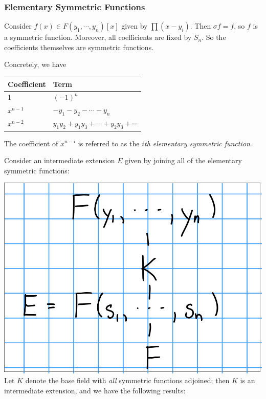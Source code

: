 \hypertarget{elementary-symmetric-functions}{%
\subsubsection{Elementary Symmetric
Functions}\label{elementary-symmetric-functions}}

Consider \(f(x) \in F(y_1, \cdots, y_n)[x]\) given by \(\prod (x-y_i)\).
Then \(\sigma f = f\), so \(f\) is a symmetric function. Moreover, all
coefficients are fixed by \(S_n\). So the coefficients themselves are
symmetric functions.

Concretely, we have

\begin{longtable}[]{@{}ll@{}}
\toprule
Coefficient & Term\tabularnewline
\midrule
\endhead
1 & \((-1)^n\)\tabularnewline
\(x^{n-1}\) & \(-y_1 - y_2 - \cdots - y_n\)\tabularnewline
\(x^{n-2}\) &
\(y_1y_2 + y_1y_3 + \cdots + y_2y_3 + \cdots\)\tabularnewline
\bottomrule
\end{longtable}

The coefficient of \(x^{n-i}\) is referred to as the \emph{\(i\)th
elementary symmetric function}.

Consider an intermediate extension \(E\) given by joining all of the
elementary symmetric functions:

\includegraphics{figures/2019-10-17-09:56.png}\\

Let \(K\) denote the base field with \emph{all} symmetric functions
adjoined; then \(K\) is an intermediate extension, and we have the
following results:

